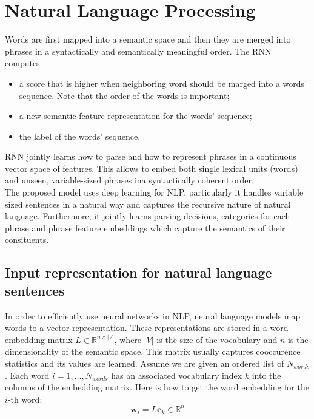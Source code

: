 \section{Natural Language Processing}

Words are first mapped into a semantic space and then they are merged into
phrases in a syntactically and semantically meaningful order.
The RNN computes:
\begin{itemize}
	\item a score that is higher when neighboring word should be marged into
		a words' sequence. Note that the order of the words is important;

	\item a new semantic feature representation for the words' sequence;

	\item the label of the words' sequence.
\end{itemize}

RNN jointly learns how to parse and how to represent phrases in a continuous
vector space of features. This allows to embed both single lexical units (words)
and unseen, variable-sized phrases ina syntactically coherent order.\\

The proposed model uses deep learning for NLP, particularly it handles variable
sized sentences in a natural way and captures the recursive nature of natural
language. Furthermore, it jointly learns parsing decisions, categories for each
phrase and phrase feature embeddings which capture the semantics of their
consituents.

\subsection{Input representation for natural language sentences}

In order to efficiently use neural networks in NLP, neural language models map
words to a vector representation. These representations are stored in a word
embedding matrix $L \in \mathbb{R}^{n \times |V|}$, where $|V|$ is the size of
the vocabulary and $n$ is the dimensionality of the semantic space.
This matrix usually captures cooccurence statistics and its values are learned.
Assume we are given an ordered list of $N_{words}$. Each word $i = 1, \dots,
N_{words}$ has an associated vocabulary index $k$ into the columns of the
embedding matrix. Here is how to get the word embedding for the $i$-th word:
\begin{equation}
	\mathbf{w}_i = L \mathbf{e}_k \in \mathbb{R}^n
\end{equation}

